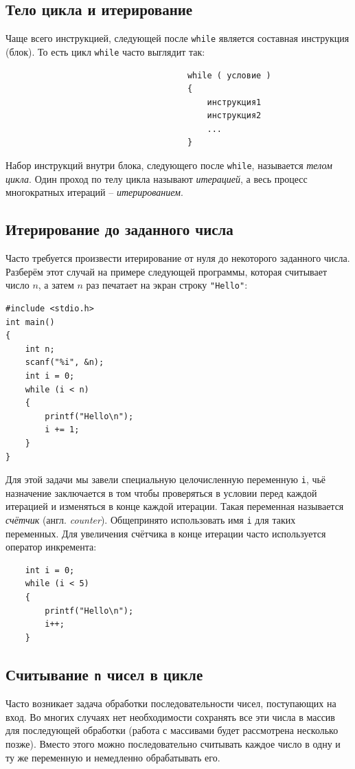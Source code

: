 \documentclass{article}
\begin{document}
\subsection*{Тело цикла и итерирование}
Чаще всего инструкцией, следующей после \texttt{while} является составная инструкция (блок). То есть цикл \texttt{while} часто выглядит так:
\begin{lstlisting}
                                     while ( условие )
                                     {
                                         инструкция1
                                         инструкция2
                                         ...
                                     }
\end{lstlisting}
Набор инструкций внутри блока, следующего после \texttt{while}, называется \textit{телом цикла}.
Один проход по телу цикла называют \textit{итерацией}, а весь процесс многократных итераций -- \textit{итерированием}.

\subsection*{Итерирование до заданного числа}
Часто требуется произвести итерирование от нуля до некоторого заданного числа. Разберём этот случай на примере следующей программы, которая считывает число $n$, а затем $n$ раз печатает на экран строку \texttt{"Hello"{}}:
\begin{lstlisting}
#include <stdio.h>
int main()
{
	int n;
	scanf("%i", &n);
	int i = 0;
    while (i < n)
    {
        printf("Hello\n");
        i += 1;
    }
}
\end{lstlisting}
Для этой задачи мы завели специальную целочисленную переменную \texttt{i}, чьё назначение заключается в том чтобы проверяться в условии перед каждой итерацией и изменяться в конце каждой итерации. Такая переменная называется \textit{счётчик} (англ. \textit{counter}). Общепринято использовать имя \texttt{i} для таких переменных. Для увеличения счётчика в конце итерации часто используется оператор инкремента:
\begin{lstlisting}
	int i = 0;
    while (i < 5)
    {
        printf("Hello\n");
        i++;
    }
\end{lstlisting}

\subsection*{Считывание \texttt{n} чисел в цикле}
Часто возникает задача обработки последовательности чисел, поступающих на вход. Во многих случаях нет необходимости сохранять все эти числа в массив для последующей обработки (работа с массивами будет рассмотрена несколько позже). Вместо этого можно последовательно считывать каждое число в одну и ту же переменную и немедленно обрабатывать его.
\end{document}
